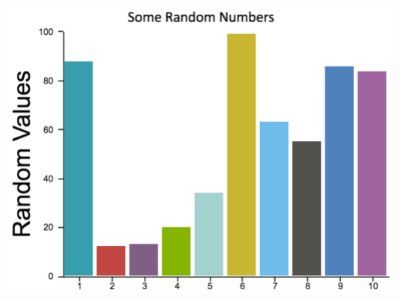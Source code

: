 \documentclass[a4paper,11pt]{report}
\begin{document}
{{ 
\begin{center}
\includegraphics[width=4in]{canvasjs-example.png}
\end{center}
   

 }

 }

   
\end{document}
